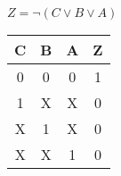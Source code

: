 
\begin{center}
    {\(Z = \lnot (C \lor B \lor A) \)}
    \begin{table}[h] %
        \begin{center}
            \begin{tabular}{|c|c|c||c|} \hline
            C & B & A & Z \\ \hline\hline
            0 & 0 & 0 & 1 \\ \hline
            1 & X & X & 0 \\ \hline
            X & 1 & X & 0 \\ \hline
            X & X & 1 & 0 \\ \hline
            \end{tabular}
        \end{center}
    \end{table}
\end{center}

